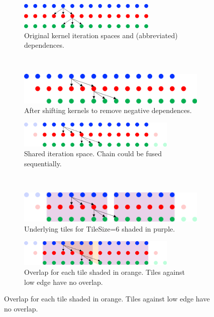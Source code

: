 \documentclass{article}
\begin{document}
\begin{figure}
	\centering

	\begin{subfigure}[t]{0.45\columnwidth}
		\centering
		\includegraphics[height=0.5in]{TilingProcess/TilingProcess1.png}
		\caption{Original kernel iteration spaces and (abbreviated) dependences.}
		\label{tiling1}
	\end{subfigure}
	~~
	\begin{subfigure}[t]{0.45\columnwidth}
		\centering
		\includegraphics[height=.5in]{TilingProcess/TilingProcess2.png}
		\caption{After shifting kernels to remove negative dependences.}
		\label{tiling2}
	\end{subfigure}
	\par\bigskip
	\begin{subfigure}[t]{0.45\textwidth}
		\centering
		\includegraphics[height=0.5in]{TilingProcess/TilingProcess3.png}
		\caption{Shared iteration space. Chain could be fused sequentially.}
		\label{tiling3}
	\end{subfigure}
	~~
	\begin{subfigure}[t]{0.45\textwidth}
		\centering
		\includegraphics[height=.5in]{TilingProcess/TilingProcess4.png}
		\caption{Underlying tiles for TileSize=6 shaded in purple.}
		\label{tiling4}
	\end{subfigure}
	\par\bigskip
	\begin{subfigure}[t]{0.45\textwidth}
		\centering
		\includegraphics[height=0.5in]{TilingProcess/TilingProcess5.png}
		\caption{Overlap for each tile shaded in orange. Tiles against low edge have no overlap.}

\end{subfigure}
\end{figure}
\end{document}

